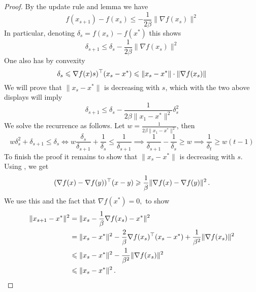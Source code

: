 \begin{proof}
By the update rule and lemma  we have
$$f(x_{s+1}) - f(x_s) \leq -\frac{1}{2\beta}\|\nabla f(x_s)\|^2 $$
In particular, denoting $\delta_s = f(x_s) - f(x^*)$ this shows
$$\delta_{s+1} \leq \delta_s - \frac{1}{2\beta}\|\nabla f(x_s)\|^2 $$
One also has by convexity
$$\delta_s \leqslant \nabla f(x)s)^\top(x_s - x^*) \leqslant \|x_s - x^*\| \cdot \|\nabla f(x_s)\|$$
We will prove that $\|x_s - x^*\|$ is decreasing with $s$, which with the two above displays will imply
$$\delta_{s+1}\leq \delta_s - \frac{1}{2\beta\|x_1 - x^*\|^2}\delta_s^2$$
We solve the recurrence as follows.  Let $w = \frac{1}{2\beta\|x_1 - x^*\|^2}$, then
$$w\delta_s^2 + \delta_{s+1} \leq \delta_s \iff w\frac{\delta_s}{\delta_{s+1}} + \frac
{1}{\delta_s} \leq \frac{1}{\delta_{s+1}} \implies \frac{1}{\delta_{s+1}} - \frac{1}{\delta_s} \geq w \implies \frac{1}{\delta_t} \geq w(t-1)$$
To finish the proof it remains to show that $\|x_s - x^*\|$ is decreasing with $s$.  
Using , we get
\[
(\nabla f(x) - \nabla f(y))^\top(x - y) \geqslant \frac{1}{\beta} \|\nabla f(x)
- \nabla f(y)\|^2\,.
\]
We use this and the fact that $\nabla f(x^*) = 0,$ to show
\begin{align*}
    \|x_{s+1} - x^*\|^2 &= \|x_s - \frac{1}{\beta}\nabla f(x_s) - x^*\|^2 \\
    &= \|x_s - x^*\|^2 - \frac{2}{\beta}\nabla f(x_s)^\top(x_s - x^*) + \frac{1}{\beta^2}\|\nabla f(x_s)\|^2 \\
    &\leqslant \|x_s - x^*\|^2 - \frac{1}{\beta^2} \|\nabla f(x_s)\|^2 \\
    &\leqslant \|x_s - x^*\|^2\,.
\end{align*}
\end{proof}

